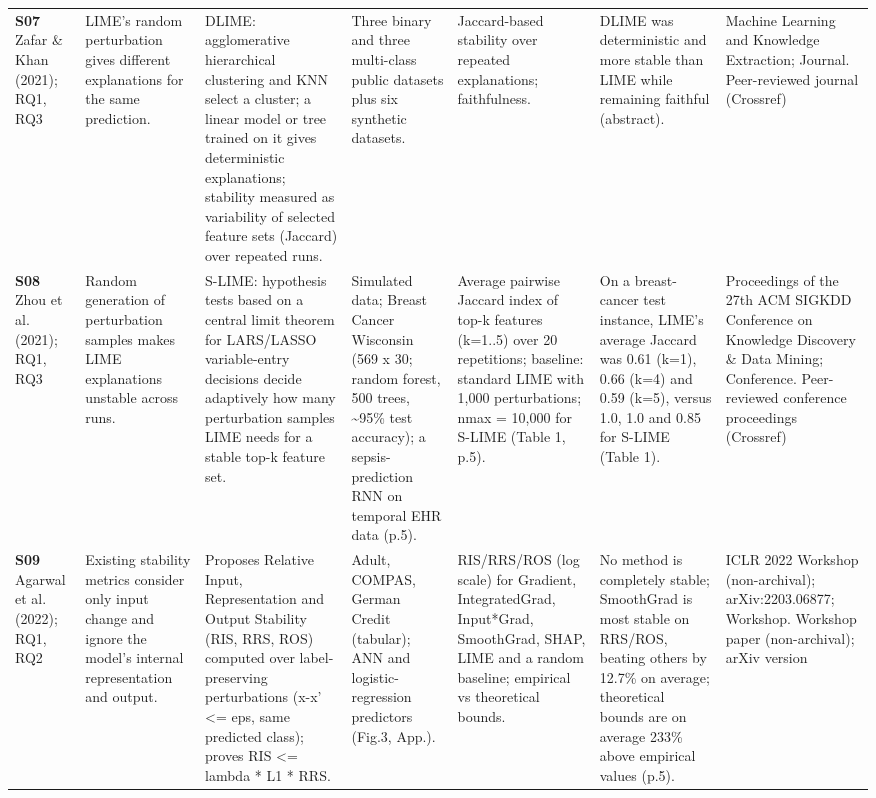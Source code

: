 \begin{longtable}{@{}P{1.55cm}P{2.9cm}P{4.5cm}P{3.2cm}P{3.4cm}P{4.6cm}P{3.6cm}@{}}
\textbf{S07} \cite{S07} Zafar \& Khan (2021); RQ1, RQ3 & LIME's random perturbation gives different explanations for the same prediction. & DLIME: agglomerative hierarchical clustering and KNN select a cluster; a linear model or tree trained on it gives deterministic explanations; stability measured as variability of selected feature sets (Jaccard) over repeated runs. & Three binary and three multi-class public datasets plus six synthetic datasets. & Jaccard-based stability over repeated explanations; faithfulness. & DLIME was deterministic and more stable than LIME while remaining faithful (abstract). & Machine Learning and Knowledge Extraction; Journal. Peer-reviewed journal (Crossref) \\
\textbf{S08} \cite{S08} Zhou et al. (2021); RQ1, RQ3 & Random generation of perturbation samples makes LIME explanations unstable across runs. & S-LIME: hypothesis tests based on a central limit theorem for LARS/\allowbreak{}LASSO variable-entry decisions decide adaptively how many perturbation samples LIME needs for a stable top-k feature set. & Simulated data; Breast Cancer Wisconsin (569 x 30; random forest, 500 trees, \textasciitilde{}95\% test accuracy); a sepsis-prediction RNN on temporal EHR data (p.5). & Average pairwise Jaccard index of top-k features (k=1..5) over 20 repetitions; baseline: standard LIME with 1,000 perturbations; nmax = 10,000 for S-LIME (Table 1, p.5). & On a breast-cancer test instance, LIME's average Jaccard was 0.61 (k=1), 0.66 (k=4) and 0.59 (k=5), versus 1.0, 1.0 and 0.85 for S-LIME (Table 1). & Proceedings of the 27th ACM SIGKDD Conference on Knowledge Discovery \& Data Mining; Conference. Peer-reviewed conference proceedings (Crossref) \\
\textbf{S09} \cite{S09} Agarwal et al. (2022); RQ1, RQ2 & Existing stability metrics consider only input change and ignore the model's internal representation and output. & Proposes Relative Input, Representation and Output Stability (RIS, RRS, ROS) computed over label-preserving perturbations (\textbar{}\textbar{}x-x'\textbar{}\textbar{} \textless{}= eps, same predicted class); proves RIS \textless{}= lambda * L1 * RRS. & Adult, COMPAS, German Credit (tabular); ANN and logistic-regression predictors (Fig.3, App.). & RIS/\allowbreak{}RRS/\allowbreak{}ROS (log scale) for Gradient, IntegratedGrad, Input*Grad, SmoothGrad, SHAP, LIME and a random baseline; empirical vs theoretical bounds. & No method is completely stable; SmoothGrad is most stable on RRS/\allowbreak{}ROS, beating others by 12.7\% on average; theoretical bounds are on average 233\% above empirical values (p.5). & ICLR 2022 Workshop (non-archival); arXiv:2203.06877; Workshop. Workshop paper (non-archival); arXiv version \\

\end{longtable}
